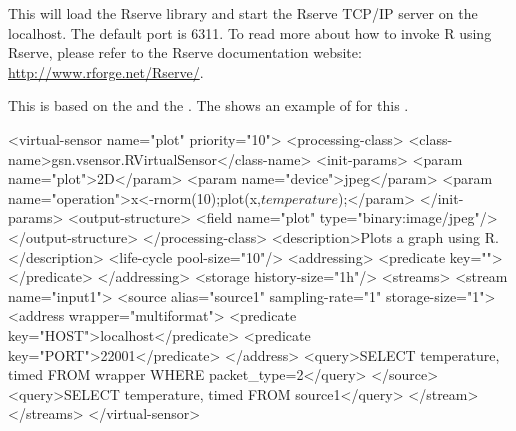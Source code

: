 This will load the Rserve library and start the Rserve TCP/IP server on the localhost. The default port is 6311. To read more about how to invoke R using Rserve, please refer to the Rserve documentation website: \url{http://www.rforge.net/Rserve/}.

This \vs is based on the  \vsp and the  \wrapper.
The  shows an example of \vsd for this \vs.

\begin{xmlcode}[caption={Sample of R VSD file}, label=listing:xml:r_vsd]
<virtual-sensor name="plot" priority="10">
	<processing-class>
	<class-name>gsn.vsensor.RVirtualSensor</class-name>
		<init-params>
      <param name="plot">2D</param>
			<param name="device">jpeg</param>
			<param name="operation">x<-rnorm(10);plot(x,$temperature$);</param>
		</init-params>
		<output-structure>
			<field name="plot" type="binary:image/jpeg"/>
		</output-structure>
	</processing-class>
	<description>Plots a graph using R.</description>
	<life-cycle pool-size="10"/>
	<addressing>
		<predicate key=""></predicate>
	</addressing>
	<storage history-size="1h"/>
  <streams>
    <stream name="input1">
    <source alias="source1" sampling-rate="1" storage-size="1">
      <address wrapper="multiformat">
          <predicate key="HOST">localhost</predicate>
          <predicate key="PORT">22001</predicate>
      </address>
      <query>SELECT temperature, timed FROM wrapper WHERE packet_type=2</query>
    </source>
    <query>SELECT temperature, timed FROM source1</query>
    </stream> 
  </streams>
</virtual-sensor>
\end{xmlcode}
